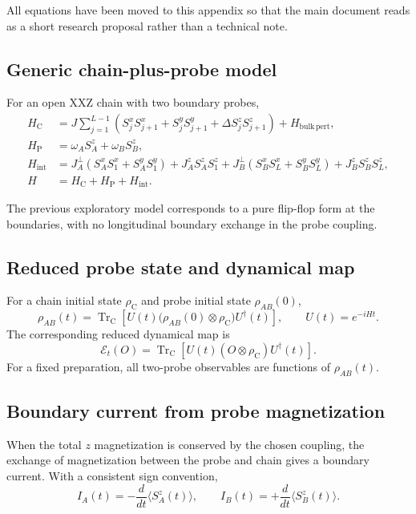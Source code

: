 \documentclass[11pt,a4paper]{article}
\begin{document}
All equations have been moved to this appendix so that the main document reads as a short research proposal rather than a technical note.

\subsection{Generic chain-plus-probe model}
For an open XXZ chain with two boundary probes,
\begin{align}
H_{\mathrm C}
&=J\sum_{j=1}^{L-1}
\left(S_j^xS_{j+1}^x+S_j^yS_{j+1}^y+\Delta S_j^zS_{j+1}^z\right)
+H_{\mathrm{bulk\,pert}},\\
H_{\mathrm P}
&=\omega_A S_A^z+\omega_B S_B^z,\\
H_{\mathrm{int}}
&=J_A^{\perp}(S_A^xS_1^x+S_A^yS_1^y)+J_A^zS_A^zS_1^z
+J_B^{\perp}(S_B^xS_L^x+S_B^yS_L^y)+J_B^zS_B^zS_L^z,\\
H&=H_{\mathrm C}+H_{\mathrm P}+H_{\mathrm{int}}.
\end{align}

The previous exploratory model corresponds to a pure flip-flop form at the boundaries, with no longitudinal boundary exchange in the probe coupling.

\subsection{Reduced probe state and dynamical map}
For a chain initial state $\rho_{\mathrm C}$ and probe initial state $\rho_{AB}(0)$,
\begin{equation}
\rho_{AB}(t)=\operatorname{Tr}_{\mathrm C}
\left[U(t)\bigl(\rho_{AB}(0)\otimes\rho_{\mathrm C}\bigr)U^{\dagger}(t)\right],
\qquad U(t)=e^{-iHt}.
\end{equation}
The corresponding reduced dynamical map is
\begin{equation}
\mathcal E_t(O)=\operatorname{Tr}_{\mathrm C}
\left[U(t)(O\otimes\rho_{\mathrm C})U^{\dagger}(t)\right].
\end{equation}
For a fixed preparation, all two-probe observables are functions of $\rho_{AB}(t)$.

\subsection{Boundary current from probe magnetization}
When the total $z$ magnetization is conserved by the chosen coupling, the exchange of magnetization between the probe and chain gives a boundary current.  With a consistent sign convention,
\begin{equation}
I_A(t)=-\frac{d}{dt}\langle S_A^z(t)\rangle,
\qquad
I_B(t)=+\frac{d}{dt}\langle S_B^z(t)\rangle.
\end{equation}
\end{document}
